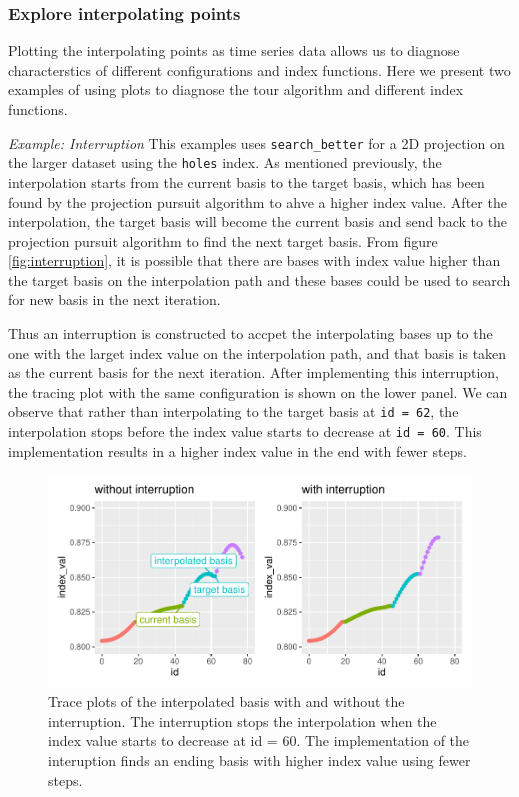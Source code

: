 \documentclass[12pt]{article}
\begin{document}
\hypertarget{explore-interpolating-points}{%
\subsubsection{Explore interpolating
points}\label{explore-interpolating-points}}

Plotting the interpolating points as time series data allows us to
diagnose characterstics of different configurations and index functions.
Here we present two examples of using plots to diagnose the tour
algorithm and different index functions.

\emph{Example: Interruption} This examples uses \texttt{search\_better}
for a 2D projection on the larger dataset using the \texttt{holes}
index. As mentioned previously, the interpolation starts from the
current basis to the target basis, which has been found by the
projection pursuit algorithm to ahve a higher index value. After the
interpolation, the target basis will become the current basis and send
back to the projection pursuit algorithm to find the next target basis.
From figure \ref{fig:interruption}, it is possible that there are bases
with index value higher than the target basis on the interpolation path
and these bases could be used to search for new basis in the next
iteration.

Thus an interruption is constructed to accpet the interpolating bases up
to the one with the larget index value on the interpolation path, and
that basis is taken as the current basis for the next iteration. After
implementing this interruption, the tracing plot with the same
configuration is shown on the lower panel. We can observe that rather
than interpolating to the target basis at \texttt{id\ =\ 62}, the
interpolation stops before the index value starts to decrease at
\texttt{id\ =\ 60}. This implementation results in a higher index value
in the end with fewer steps.

\begin{figure}
\centering
\includegraphics{paper_files/figure-latex/interruption-1.pdf}
\caption{\label{interruption}Trace plots of the interpolated basis with
and without the interruption. The interruption stops the interpolation
when the index value starts to decrease at id = 60. The implementation
of the interuption finds an ending basis with higher index value using
fewer steps.}
\end{figure}
\end{document}
